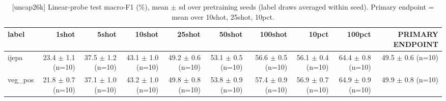 \begin{table}[t]
\centering
\small
\caption{[uncap26k] Linear-probe test macro-F1 (\%), mean $\pm$ sd over pretraining seeds (label draws averaged within seed). Primary endpoint = mean over 10shot, 25shot, 10pct.}
\label{tab:main_results_probe}
\begin{tabular}{lrrrrrrrrr}
\toprule
label & 1shot & 5shot & 10shot & 25shot & 50shot & 100shot & 10pct & 100pct & PRIMARY ENDPOINT \\
\midrule
ijepa & 23.4 $\pm$ 1.1 (n=10) & 37.5 $\pm$ 1.2 (n=10) & 43.1 $\pm$ 1.0 (n=10) & 49.2 $\pm$ 0.6 (n=10) & 53.1 $\pm$ 0.5 (n=10) & 56.6 $\pm$ 0.5 (n=10) & 56.1 $\pm$ 0.4 (n=10) & 64.4 $\pm$ 0.8 (n=10) & 49.5 $\pm$ 0.6 (n=10) \\
veg\_pos & 21.8 $\pm$ 0.7 (n=10) & 37.1 $\pm$ 1.0 (n=10) & 43.2 $\pm$ 1.0 (n=10) & 49.8 $\pm$ 0.8 (n=10) & 53.8 $\pm$ 0.9 (n=10) & 57.4 $\pm$ 0.9 (n=10) & 56.9 $\pm$ 0.7 (n=10) & 64.9 $\pm$ 0.9 (n=10) & 49.9 $\pm$ 0.8 (n=10) \\
\bottomrule
\end{tabular}
\end{table}
